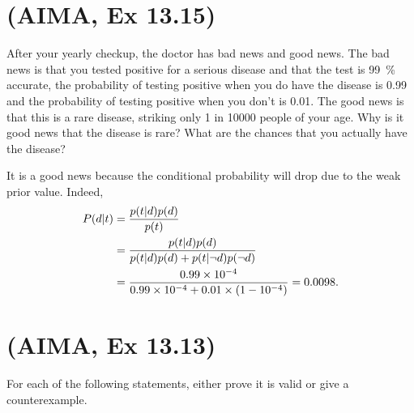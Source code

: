 \documentclass[11pt, a4paper]{article}
\begin{document}
\section{(AIMA, Ex 13.15)}

After your yearly checkup, the doctor has bad news and good news. The bad news is that you tested positive for a serious disease and that the test is \SI{99}{\percent} accurate, \ie{} the probability of testing positive when you do have the disease is \num{0.99} and the probability of testing positive when you don't is \num{0.01}. The good news is that this is a rare disease, striking only 1 in \num{10000} people of your age. Why is it good news that the disease is rare? What are the chances that you actually have the disease?

\begin{solution}
    It is a good news because the conditional probability will drop due to the weak prior value. Indeed,
    \begin{align*}
        P(d \vert t) & = \frac{p(t \vert d) p(d)}{p(t)} \\
        & = \frac{p(t \vert d) p(d)}{p(t \vert d) p(d) + p(t \vert \neg d) p(\neg d)} \\
        & = \frac{0.99 \times \num{e-4}}{0.99 \times \num{e-4} + 0.01 \times (1 - \num{e-4})} = \num{0.0098} .
    \end{align*}
\end{solution}

\newpage

\section{(AIMA, Ex 13.13)}

For each of the following statements, either prove it is valid or give a counterexample.
\end{document}
